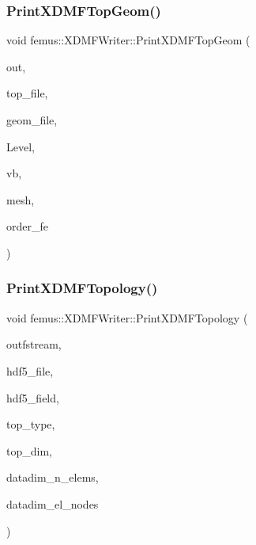 \mbox{\label{classfemus_1_1_x_d_m_f_writer_aaa2aedefd31c903c11a6c51639636b10}} 
\subsubsection{\texorpdfstring{Print\+X\+D\+M\+F\+Top\+Geom()}{PrintXDMFTopGeom()}}
{\footnotesize\ttfamily void femus\+::\+X\+D\+M\+F\+Writer\+::\+Print\+X\+D\+M\+F\+Top\+Geom (\begin{DoxyParamCaption}\item[{std\+::ofstream \&}]{out,  }\item[{std\+::ostringstream \&}]{top\+\_\+file,  }\item[{std\+::ostringstream \&}]{geom\+\_\+file,  }\item[{const \mbox{\hyperlink{_typedefs_8hpp_a91ad9478d81a7aaf2593e8d9c3d06a14}{uint}}}]{Level,  }\item[{const \mbox{\hyperlink{_typedefs_8hpp_a91ad9478d81a7aaf2593e8d9c3d06a14}{uint}}}]{vb,  }\item[{const \mbox{\hyperlink{classfemus_1_1_multi_level_mesh_two}{Multi\+Level\+Mesh\+Two}} \&}]{mesh,  }\item[{const \mbox{\hyperlink{_typedefs_8hpp_a91ad9478d81a7aaf2593e8d9c3d06a14}{uint}}}]{order\+\_\+fe }\end{DoxyParamCaption})\hspace{0.3cm}{\ttfamily [static]}}

\mbox{\label{classfemus_1_1_x_d_m_f_writer_a9ce5aae47c60010f3548f67bd3958734}} 
\subsubsection{\texorpdfstring{Print\+X\+D\+M\+F\+Topology()}{PrintXDMFTopology()}}
{\footnotesize\ttfamily void femus\+::\+X\+D\+M\+F\+Writer\+::\+Print\+X\+D\+M\+F\+Topology (\begin{DoxyParamCaption}\item[{std\+::ofstream \&}]{outfstream,  }\item[{std\+::string}]{hdf5\+\_\+file,  }\item[{std\+::string}]{hdf5\+\_\+field,  }\item[{std\+::string}]{top\+\_\+type,  }\item[{int}]{top\+\_\+dim,  }\item[{int}]{datadim\+\_\+n\+\_\+elems,  }\item[{int}]{datadim\+\_\+el\+\_\+nodes }\end{DoxyParamCaption})\hspace{0.3cm}{\ttfamily [static]}}


